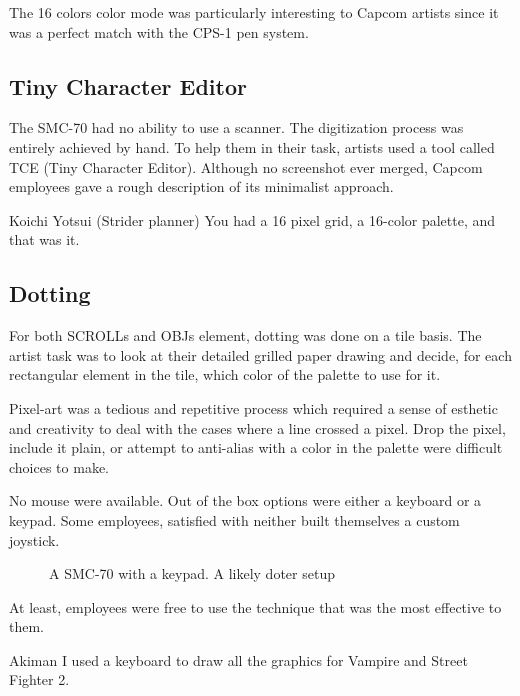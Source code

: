 The 16 colors color mode was particularly interesting to Capcom artists since it was a perfect match with the CPS-1 pen system.


\subsection{Tiny Character Editor}

The SMC-70 had no ability to use a scanner. The digitization process was entirely achieved by hand. To help them in their task, artists used a tool called TCE (Tiny Character Editor). Although no screenshot ever merged, Capcom employees gave a rough description of its minimalist approach.

\begin{q}{Koichi Yotsui (Strider planner)}
You had a 16 pixel grid, a 16-color palette, and that was it.
\end{q}


\subsection{Dotting}
For both SCROLLs and OBJs element, dotting was done on a tile basis. The artist task was to look at their detailed grilled paper drawing and decide, for each rectangular element in the tile, which color of the palette to use for it.

Pixel-art was a tedious and repetitive process which required a sense of esthetic and creativity to deal with the cases where a line crossed a pixel. Drop the pixel, include it plain, or attempt to anti-alias with a color in the palette were difficult choices to make.


No mouse were available. Out of the box options were either a keyboard or a keypad. Some employees, satisfied with neither built themselves a custom joystick.


\begin{figure}[H]
\caption*{A SMC-70 with a keypad. A likely doter setup}
\end{figure}


At least, employees were free to use the technique that was the most effective to them.

\begin{q}{Akiman\cite{akiman}}
I used a keyboard to draw all the graphics for Vampire and Street Fighter 2.
\end{q}



